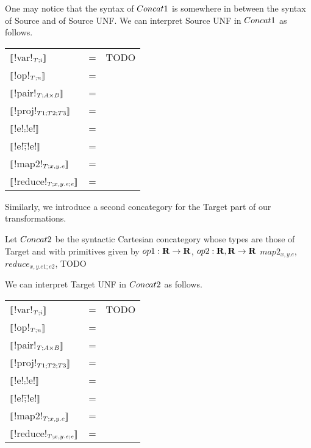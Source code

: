One may notice that the syntax of $Concat1$ is somewhere in between the syntax of Source and of Source UNF.
We can interpret Source UNF in $Concat1$ as follows.

\begin{tabular}{l c l}
   $\llbracket$!var!$_{T;i} \rrbracket$ &=& TODO \\
   $\llbracket$!op!$_{T;n} \rrbracket$ &=& \\
   $\llbracket$!pair!$_{T;A\times B} \rrbracket$ &=& \\
   $\llbracket$!proj!$_{T1;T2;T3} \rrbracket$ &=& \\
   $\llbracket$!e!$\comp$!e!$\rrbracket$  &=& \\
   $\llbracket$!e!$\widetilde{;}$!e!$\rrbracket$ &=& \\
   $\llbracket$!map2!$_{T;x,y.e}\rrbracket$  &=& \\
   $\llbracket$!reduce!$_{T;x,y.e;e}\rrbracket$  &=& \\
\end{tabular}

Similarly, we introduce a second concategory for the Target part of our transformations.

\begin{definition}[$\ConcatT$]
Let $\ConcatT$ be the syntactic Cartesian concategory whose types are those of Target and 
with primitives given by $op1: \mathbf{R} \to \mathbf{R}$, $op2: \mathbf{R},\mathbf{R} \to \mathbf{R}$ $map2_{x,y.e}$, 
$reduce_{x,y.e1;e2}$, TODO
\end{definition}

We can interpret Target UNF in $\ConcatT$ as follows.

\begin{tabular}{l c l}
    $\llbracket$!var!$_{T;i} \rrbracket$ &=& TODO \\
    $\llbracket$!op!$_{T;n} \rrbracket$ &=& \\
    $\llbracket$!pair!$_{T;A\times B} \rrbracket$ &=& \\
    $\llbracket$!proj!$_{T1;T2;T3} \rrbracket$ &=& \\
    $\llbracket$!e!$\comp$!e!$\rrbracket$  &=& \\
    $\llbracket$!e!$\widetilde{;}$!e!$\rrbracket$ &=& \\
    $\llbracket$!map2!$_{T;x,y.e}\rrbracket$  &=& \\
    $\llbracket$!reduce!$_{T;x,y.e;e}\rrbracket$  &=& \\
 \end{tabular}


